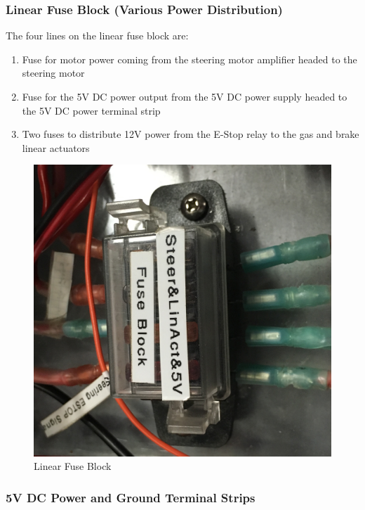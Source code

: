 \subsubsection{Linear Fuse Block (Various Power Distribution)}

\begin{minipage}{0.6\textwidth}
The four lines on the linear fuse block are:
\begin{enumerate}
\item Fuse for motor power coming from the steering motor amplifier headed to the steering motor
\item Fuse for the 5V DC power output from the 5V DC power supply headed to the 5V DC power terminal strip
\item Two fuses to distribute 12V power from the E-Stop relay to the gas and brake linear actuators
\end{enumerate}
\end{minipage} \hfill
\begin{minipage}{0.5\textwidth}
\begin{figure}[H]
\centering
\includegraphics[scale=.06]{Photos/5vblock.jpg}
\caption{\label{fig:linear} Linear Fuse Block}
\end{figure}
\end{minipage}

\subsubsection{5V DC Power and Ground Terminal Strips}

